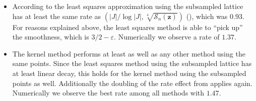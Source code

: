 \documentclass[a4paper]{amsart}
\begin{document}
\begin{itemize}
\item[{\color{blue}\scalebox{0.7}{\rotatebox{45}{$\square$}}}:]
    According to  the least squares approximation using the subsampled lattice has at least the same rate as $(|J|/\log |J|, \sqrt[4]{\mathcal S_n(\bm z)})$ (\scalebox{1.2}{$\circ$}), which was $0.93$.
    For reasons explained above, the least squares method is able to ``pick up'' the smoothness, which is $3/2-\varepsilon$.
    Numerically we observe a rate of $1.37$.

\item[{\color{orange}\scalebox{0.7}{$\triangle$}}:]
    The kernel method performs at least as well as any other method using the same points.
    Since the least squares method using the subsampled lattice has at least linear decay, this holds for the kernel method using the subsampled points as well.
    Additionally the doubling of the rate effect from \cite{SK25} applies again.
    Numerically we observe the best rate among all methods with $1.47$.
\end{itemize}
\end{document}
